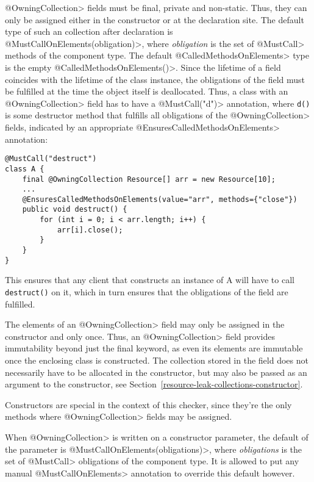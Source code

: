 \<@OwningCollection> fields must be final, private and non-static. Thus, they can only be assigned either in the constructor or at the declaration site.
The default type of such an collection after declaration is \<@MustCallOnElements(obligation)>, where \textit{obligation} is the set of \<@MustCall> methods of the component type. The default \<@CalledMethodsOnElements> type is the empty \<@CalledMethodsOnElements({})>.
Since the lifetime of a field coincides with the lifetime of the class instance, the obligations of the field must be fulfilled at the time the object itself is deallocated.
Thus, a class with an \<@OwningCollection> field has to have a \<@MustCall("d")> annotation, where \texttt{d()} is some destructor method that fulfills all obligations of the \<@OwningCollection> fields, indicated by an appropriate \<@EnsuresCalledMethodsOnElements> annotation:

\begin{verbatim}
@MustCall("destruct")
class A {
    final @OwningCollection Resource[] arr = new Resource[10];
    ...
    @EnsuresCalledMethodsOnElements(value="arr", methods={"close"})
    public void destruct() {
        for (int i = 0; i < arr.length; i++) {
            arr[i].close();
        }
    }
}
\end{verbatim}

This ensures that any client that constructs an instance of A will have to call \texttt{destruct()} on it, which in turn ensures that the obligations of the field are fulfilled.

The elements of an \<@OwningCollection> field may only be assigned in the constructor and only once. Thus, an \<@OwningCollection> field provides immutability beyond just the final keyword, as even its elements are immutable once the enclosing class is constructed. The collection stored in the field does not necessarily have to be allocated in the constructor, but may also be passed as an argument to the constructor, see Section~\ref{resource-leak-collections-constructor}.

Constructors are special in the context of this checker, since they're the only methods where \<@OwningCollection> fields may be assigned.

When \<@OwningCollection> is written on a constructor parameter, the default of the parameter is \<@MustCallOnElements(obligations)>, where \textit{obligations} is the set of \<@MustCall> obligations of the component type. It is allowed to put any manual \<@MustCallOnElements> annotation to override this default however.

